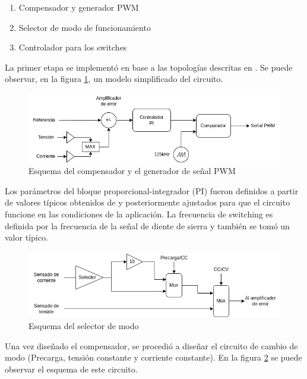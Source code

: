 \begin{enumerate}
    \item Compensador y generador PWM
    \item Selector de modo de funcionamiento
    \item Controlador para los switches
\end{enumerate}

La primer etapa se implementó en base a las topologías descritas en \cite{mohan}. Se puede observar,
en la figura \ref{fig:esquema_compensador}, un modelo simplificado del circuito.

\begin{figure}
    \centering
    \includegraphics[width=\textwidth]{images/compensador.png}
    \caption{Esquema del compensador y el generador de señal PWM}
    \label{fig:esquema_compensador}
\end{figure}

Los parámetros del bloque proporcional-integrador (PI) fueron definidos a partir de valores típicos obtenidos de \cite{mohan}
y posteriormente ajustados para que el circuito funcione en las condiciones de la aplicación.
La frecuencia de switching es definida por la frecuencia de la señal de diente de sierra y también se tomó un valor típico.

\begin{figure}
    \centering
    \includegraphics[width=\textwidth]{images/selector.png}
    \caption{Esquema del selector de modo}
    \label{fig:esquema_selector}
\end{figure}

Una vez diseñado el compensador, se procedió a diseñar el circuito de cambio de modo (Precarga, tensión constante y corriente constante).
En la figura \ref{fig:esquema_selector} se puede observar el esquema de este circuito.

